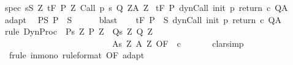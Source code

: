 \begin{isabellebody}
\ spec{\isacharcolon}\ {\isachardoublequoteopen}{\isasymforall}s{\isasymin}S{\isachardot}\ {\isasymforall}Z{\isachardot}\ {\isasymGamma}{\isacharcomma}{\isasymTheta}{\isasymturnstile}\isactrlsub t\isactrlbsub {\isacharslash}F\isactrlesub \ {\isacharparenleft}P{\isacharprime}\ Z{\isacharparenright}\ Call\ {\isacharparenleft}p\ s{\isacharparenright}\ {\isacharparenleft}Q{\isacharprime}\ Z{\isacharparenright}{\isacharcomma}{\isacharparenleft}A{\isacharprime}\ Z{\isacharparenright}{\isachardoublequoteclose}\isanewline
{}\ {\isachardoublequoteopen}{\isasymGamma}{\isacharcomma}{\isasymTheta}{\isasymturnstile}\isactrlsub t\isactrlbsub {\isacharslash}F\isactrlesub \ P\ {\isacharparenleft}dynCall\ init\ p\ return\ c{\isacharparenright}\ Q{\isacharcomma}A{\isachardoublequoteclose}\isanewline
%
\isadelimproof
%
\endisadelimproof
%
\isatagproof
{}\isamarkupfalse%
\ {\isacharminus}\isanewline
\ \ \isamarkupfalse%
\ adapt\ \isamarkupfalse%
\ P{\isacharunderscore}S{\isacharcolon}\ {\isachardoublequoteopen}P\ {\isasymsubseteq}\ S{\isachardoublequoteclose}\isanewline
\ \ \ \ \isamarkupfalse%
\ blast\isanewline
\ \ \isamarkupfalse%
\ {\isachardoublequoteopen}{\isasymGamma}{\isacharcomma}{\isasymTheta}{\isasymturnstile}\isactrlsub t\isactrlbsub {\isacharslash}F\isactrlesub \ {\isacharparenleft}P\ {\isasyminter}\ S{\isacharparenright}\ {\isacharparenleft}dynCall\ init\ p\ return\ c{\isacharparenright}\ Q{\isacharcomma}A{\isachardoublequoteclose}\isanewline
\ \ \ \ \isamarkupfalse%
\ {\isacharparenleft}rule\ DynProc\ {\isacharbrackleft}\ P{\isacharprime}{\isacharequal}{\isachardoublequoteopen}{\isasymlambda}s\ Z{\isachardot}\ P{\isacharprime}\ Z{\isachardoublequoteclose}\ \ Q{\isacharprime}{\isacharequal}{\isachardoublequoteopen}{\isasymlambda}s\ Z{\isachardot}\ Q{\isacharprime}\ Z{\isachardoublequoteclose}\ \isanewline
\ \ \ \ \ \ \ \ \ \ \ \ \ \ \ \ \ \ \ \ \ \ \ \ \ \ A{\isacharprime}{\isacharequal}{\isachardoublequoteopen}{\isasymlambda}s\ Z{\isachardot}\ A{\isacharprime}\ Z{\isachardoublequoteclose}{\isacharcomma}\ OF\ {\isacharunderscore}\ c{\isacharbrackright}{\isacharparenright}\isanewline
\ \ \ \ \isamarkupfalse%
\ \ clarsimp\isanewline
\ \ \ \ \isamarkupfalse%
\ \ {\isacharparenleft}frule\ in{\isacharunderscore}mono\ {\isacharbrackleft}rule{\isacharunderscore}format{\isacharcomma}\ OF\ adapt{\isacharbrackright}{\isacharparenright}\isanewline
\ \ \ \ \isamarkupfalse%

\end{isabellebody}
